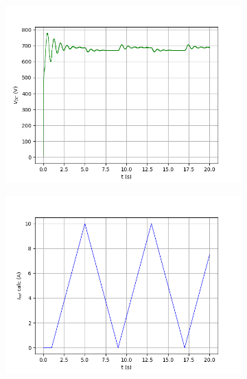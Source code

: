 \begin{figure}[!hbt]
	\centering
	\begin{subfigure}[b]{0.49\textwidth}
	\centering
		\includegraphics[width=\textwidth]{figuras/sim_figures/inversor_e_boost_variavel/tensao_barramento.png}
		\caption{}
	\end{subfigure}
	\begin{subfigure}[b]{0.49\textwidth}
	\centering
		\includegraphics[width=\textwidth]{figuras/sim_figures/inversor_e_boost_variavel/corrente_referencia.png}
		\caption{}
	\end{subfigure}
	\begin{subfigure}[b]{0.49\textwidth}
	\centering

\end{subfigure}
\end{figure}
